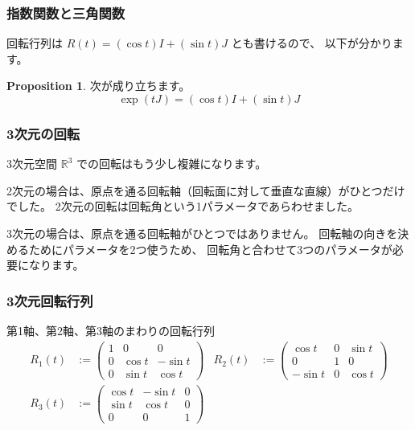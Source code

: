\documentclass{beamer}
\theoremstyle{definition}
\newtheorem{proposition}{Proposition}
\begin{document}
\begin{frame}
    \frametitle{指数関数と三角関数}

    回転行列は \(R(t) = (\cos t) I + (\sin t) J\) とも書けるので、
    以下が分かります。

    \begin{proposition}
        次が成り立ちます。
        \[
            \exp (tJ) = (\cos t) I + (\sin t) J
        \]
    \end{proposition}
\end{frame}

\begin{frame}
    \frametitle{3次元の回転}

    3次元空間 \(\mathbb{R}^3\) での回転はもう少し複雑になります。

    2次元の場合は、原点を通る回転軸（回転面に対して垂直な直線）がひとつだけでした。
    2次元の回転は回転角という1パラメータであらわせました。

    3次元の場合は、原点を通る回転軸がひとつではありません。
    回転軸の向きを決めるためにパラメータを2つ使うため、
    回転角と合わせて3つのパラメータが必要になります。
\end{frame}

\begin{frame}
    \frametitle{3次元回転行列}

    \begin{definition}
        第1軸、第2軸、第3軸のまわりの回転行列
        \begin{align*}
            R_1(t) & :=
            \begin{pmatrix}
                1 & 0 & 0 \\
                0 & \cos t & - \sin t \\
                0 & \sin t & \cos t
            \end{pmatrix} &
            R_2(t) & :=
            \begin{pmatrix}
                \cos t & 0 & \sin t \\
                0 & 1 & 0 \\
                - \sin t & 0 & \cos t
            \end{pmatrix} \\
            R_3(t) & :=
            \begin{pmatrix}
                \cos t & - \sin t & 0 \\
                \sin t & \cos t & 0 \\
                0 & 0 & 1
            \end{pmatrix}
        \end{align*}
    \end{definition}
\end{frame}
\end{document}
